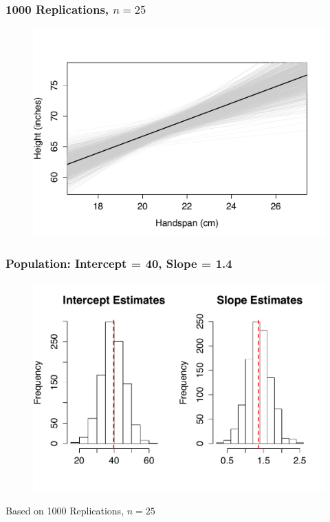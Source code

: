 \documentclass[handout]{beamer}
\begin{document}
\begin{frame}
\frametitle{1000 Replications, $n=25$}

\begin{figure}[h]
\centering
\includegraphics[scale = 0.6]{./images/reg_lines_sim}

\end{figure}


\end{frame}


\begin{frame}
\frametitle{Population: Intercept = 40, Slope = 1.4}

\begin{figure}[h]
\centering
\includegraphics[scale = 0.55]{./images/reg_sim_hist}

\end{figure}
\alert{Based on 1000 Replications, $n = 25$}

\end{frame}
\end{document}
